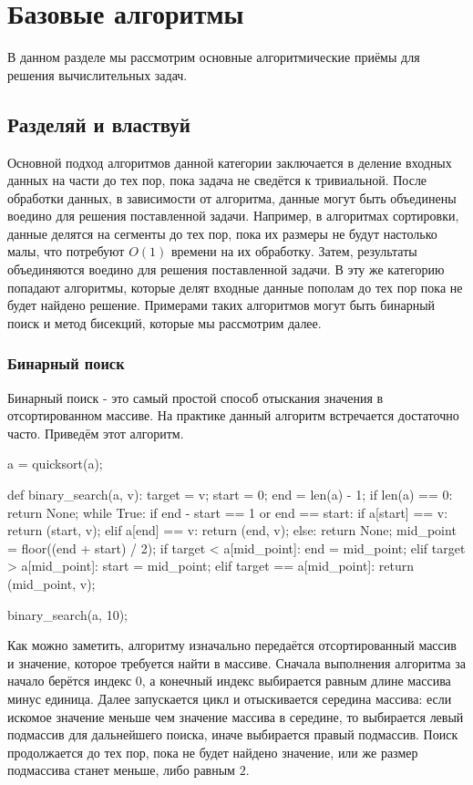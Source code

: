 \chapter{Базовые алгоритмы}

В данном разделе мы рассмотрим основные алгоритмические приёмы 
для решения вычислительных задач. 

\section{Разделяй и властвуй}

Основной подход алгоритмов данной категории заключается 
в деление входных данных на части до тех пор, пока задача 
не сведётся к тривиальной. После обработки данных, в 
зависимости от алгоритма, данные могут быть объединены 
воедино для решения поставленной задачи. Например, 
в алгоритмах сортировки, данные делятся на 
сегменты до тех пор, пока их размеры не будут 
настолько малы, что потребуют $O(1)$ времени 
на их обработку. Затем, результаты объединяются 
воедино для решения поставленной задачи. 
В эту же категорию попадают алгоритмы, 
которые делят входные данные пополам до тех пор 
пока не будет найдено решение. Примерами
таких алгоритмов могут быть бинарный поиск и 
метод бисекций, которые мы рассмотрим далее.

\subsection{Бинарный поиск}

Бинарный поиск - это самый простой способ отыскания значения в 
отсортированном массиве. На практике данный алгоритм встречается 
достаточно часто. Приведём этот алгоритм.

\begin{python}
a = quicksort(a);

def binary_search(a, v):
	target = v;
	start = 0;
	end = len(a) - 1;
	if len(a) == 0:
		return None;
	while True:
		if end - start == 1 or end == start:
			if a[start] == v:
				return (start, v);
			elif a[end] == v:
				return (end, v);
			else:
				return None;
		mid_point = floor((end + start) / 2);
		if target < a[mid_point]:
			end = mid_point;
		elif target > a[mid_point]:
			start = mid_point;
		elif target == a[mid_point]:
			return (mid_point, v);

binary_search(a, 10);

\end{python}

Как можно заметить, алгоритму изначально 
передаётся отсортированный массив и значение, 
которое требуется найти в массиве. Сначала 
выполнения алгоритма за начало берётся 
индекс $0$, а конечный индекс выбирается
равным длине массива минус единица. Далее 
запускается цикл и отыскивается середина массива:
если искомое значение меньше чем значение массива
в середине, то выбирается левый подмассив для 
дальнейшего поиска, иначе выбирается правый подмассив.
Поиск продолжается до тех пор, пока не будет
найдено значение, или же размер подмассива 
станет меньше, либо равным $2$.

